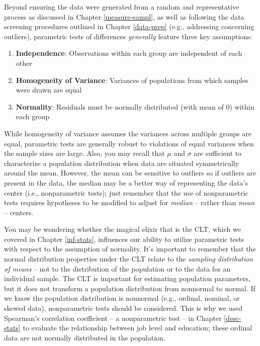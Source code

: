 \documentclass[
]{book}
\providecommand{\tightlist}{%
  \setlength{\itemsep}{0pt}\setlength{\parskip}{0pt}}
\begin{document}
Beyond ensuring the data were generated from a random and representative process as discussed in Chapter \ref{measure-sampl}, as well as following the data screening procedures outlined in Chapter \ref{data-prep} (e.g., addressing concerning outliers), parametric tests of differences \emph{generally} feature three key assumptions:

\begin{enumerate}
\def\labelenumi{\arabic{enumi}.}
\tightlist
\item
  \textbf{Independence}: Observations within each group are independent of each other
\item
  \textbf{Homogeneity of Variance}: Variances of populations from which samples were drawn are equal
\item
  \textbf{Normality}: Residuals must be normally distributed (with mean of 0) within each group
\end{enumerate}

While homogeneity of variance assumes the variances across multiple groups are equal, parametric tests are generally robust to violations of equal variances when the sample sizes are large. Also, you may recall that \(\mu\) and \(\sigma\) are sufficient to characterize a population distribution when data are situated symmetrically around the mean. However, the mean can be sensitive to outliers so if outliers are present in the data, the median may be a better way of representing the data's center (i.e., nonparametric tests); just remember that the use of nonparametric tests requires hypotheses to be modified to adjust for \emph{median} -- rather than \emph{mean} -- centers.

You may be wondering whether the magical elixir that is the CLT, which we covered in Chapter \ref{inf-stats}, influences our ability to utilize parametric tests with respect to the assumption of normality. It's important to remember that the normal distribution properties under the CLT relate to the \emph{sampling distribution of means} -- not to the distribution of the population or to the data for an individual sample. The CLT is important for estimating population parameters, but it does not transform a population distribution from nonnormal to normal. If we know the population distribution is nonnormal (e.g., ordinal, nominal, or skewed data), nonparametric tests should be considered. This is why we used Spearman's correlation coefficient -- a nonparametric test -- in Chapter \ref{desc-stats} to evaluate the relationship between job level and education; these ordinal data are not normally distributed in the population.
\end{document}
